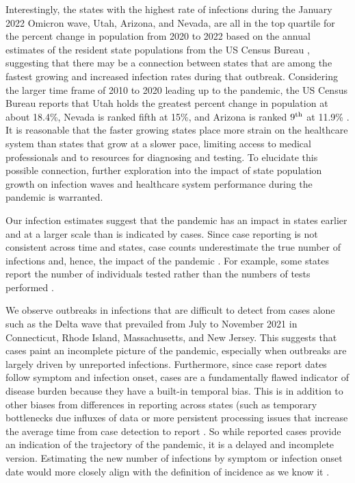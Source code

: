 \documentclass{article}
\begin{document}
Interestingly, the states with the highest rate of infections during the January
2022 Omicron wave, Utah, Arizona, and Nevada, are all in the top quartile for
the percent change in population from 2020 to 2022 based on the annual estimates
of the resident state populations from the US Census Bureau
\citep{uscensus2022annual}, suggesting that there may be a connection between
states that are among the fastest growing and increased infection rates during
that outbreak. Considering the larger time frame of 2010 to 2020 leading up to
the pandemic, the US Census Bureau reports that Utah holds the greatest percent
change in population at about 18.4\%, Nevada is ranked fifth at 15\%, and
Arizona is ranked $9^{\textnormal{th}}$ at 11.9\% \citep{censusbureau2020}. It is reasonable
that the faster growing states place more strain on the healthcare system than
states that grow at a slower pace, limiting access to medical professionals and
to resources for diagnosing and testing. To elucidate this possible connection,
further exploration into the impact of state population growth on infection
waves and healthcare system performance during the pandemic is warranted.

Our infection estimates suggest that the pandemic has an impact
in states earlier and at a larger scale than is indicated by cases. Since
case reporting is not consistent across time and states, case counts
underestimate the true number of infections and, hence, the impact of the
pandemic \citep{cdc2022estimated, simon2022inconsistent}. For example, some
states report the number of individuals tested rather than the numbers of tests
performed \citep{schechtman2020counting, chitwood2021reconstructing}.

We observe outbreaks in infections that are difficult to detect from cases
alone such as the Delta wave that prevailed from July to November 2021 in Connecticut, 
Rhode Island, Massachusetts, and New Jersey. This suggests that cases paint an incomplete 
picture of the pandemic, especially when outbreaks are largely driven by 
unreported infections. Furthermore, since case report dates follow symptom and infection
onset, cases are a fundamentally flawed indicator of disease burden because they
have a built-in temporal bias. This is in addition to other biases from
differences in reporting across states (such as temporary bottlenecks due
influxes of data or more persistent processing issues that increase the average
time from case detection to report \citep{wash2020dash, dunkel2020covid19}. So
while reported cases provide an indication of the trajectory of the pandemic, it
is a delayed and incomplete version. Estimating the new number of infections by
symptom or infection onset date would more closely align with the definition of
incidence as we know it \citep{jahja2022real}.
\end{document}
